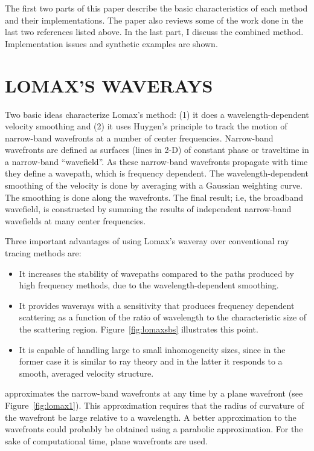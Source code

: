 The first two parts of this paper describe the 
basic characteristics of each method and their
implementations. The paper also reviews some of the work
done in the last two references listed above. 
In the last part, I discuss
the combined method. Implementation issues and synthetic
examples are shown.

\section{LOMAX'S WAVERAYS}

Two basic ideas characterize Lomax's method: (1)
it does a wavelength-dependent velocity smoothing and
(2) it uses Huygen's principle to track the motion
of narrow-band wavefronts at a number of center frequencies.
Narrow-band wavefronts are defined as surfaces (lines in \mbox{2-D})
of constant phase or traveltime in a narrow-band ``wavefield''.
As these narrow-band wavefronts propagate with time they define
a wavepath, which is frequency dependent. The wavelength-dependent
smoothing of the velocity is done by averaging with a Gaussian weighting 
curve. The smoothing is done along the wavefronts. The final result; i.e,
the broadband wavefield, is constructed by summing the results of 
independent narrow-band wavefields at many center frequencies.

Three important advantages of using Lomax's waveray over conventional
ray tracing methods are: 
\begin{itemize}
 \item It increases the stability of wavepaths compared
  to the paths produced by high frequency methods, due to the
  wavelength-dependent smoothing.
 \item It provides 
  waverays with a sensitivity that produces
  frequency dependent scattering as a function of the ratio of 
  wavelength to the characteristic size of the scattering region.
  Figure~\ref{fig:lomaxsbs} illustrates this point.
 \item It is capable of handling large to small inhomogeneity sizes,
  since in the former case it is similar to ray theory and in the
  latter it responds to a smooth, averaged velocity structure. 
\end{itemize}

\cite{Lomax} approximates 
the narrow-band wavefronts at any time by a plane wavefront (see
Figure~\ref{fig:lomax1}). This approximation requires that the radius
of curvature of the wavefront be large relative to a wavelength.  A
better approximation to the wavefronts could probably be obtained
using a parabolic approximation.  For the sake of computational time,
plane wavefronts are used.

